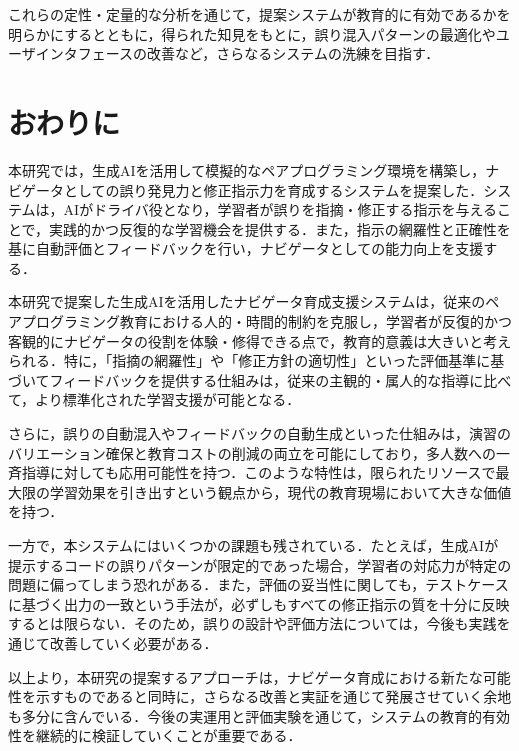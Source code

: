 \documentclass[twoside,twocolumn,10pt]{jsarticle}
\begin{document}
これらの定性・定量的な分析を通じて，提案システムが教育的に有効であるかを明らかにするとともに，得られた知見をもとに，誤り混入パターンの最適化やユーザインタフェースの改善など，さらなるシステムの洗練を目指す．


\section{おわりに}\label{sec:おわりに}

本研究では，生成AIを活用して模擬的なペアプログラミング環境を構築し，ナビゲータとしての誤り発見力と修正指示力を育成するシステムを提案した．システムは，AIがドライバ役となり，学習者が誤りを指摘・修正する指示を与えることで，実践的かつ反復的な学習機会を提供する．また，指示の網羅性と正確性を基に自動評価とフィードバックを行い，ナビゲータとしての能力向上を支援する．

本研究で提案した生成AIを活用したナビゲータ育成支援システムは，従来のペアプログラミング教育における人的・時間的制約を克服し，学習者が反復的かつ客観的にナビゲータの役割を体験・修得できる点で，教育的意義は大きいと考えられる．特に，「指摘の網羅性」や「修正方針の適切性」といった評価基準に基づいてフィードバックを提供する仕組みは，従来の主観的・属人的な指導に比べて，より標準化された学習支援が可能となる．

さらに，誤りの自動混入やフィードバックの自動生成といった仕組みは，演習のバリエーション確保と教育コストの削減の両立を可能にしており，多人数への一斉指導に対しても応用可能性を持つ．このような特性は，限られたリソースで最大限の学習効果を引き出すという観点から，現代の教育現場において大きな価値を持つ．

一方で，本システムにはいくつかの課題も残されている．たとえば，生成AIが提示するコードの誤りパターンが限定的であった場合，学習者の対応力が特定の問題に偏ってしまう恐れがある．また，評価の妥当性に関しても，テストケースに基づく出力の一致という手法が，必ずしもすべての修正指示の質を十分に反映するとは限らない．そのため，誤りの設計や評価方法については，今後も実践を通じて改善していく必要がある．

以上より，本研究の提案するアプローチは，ナビゲータ育成における新たな可能性を示すものであると同時に，さらなる改善と実証を通じて発展させていく余地も多分に含んでいる．今後の実運用と評価実験を通じて，システムの教育的有効性を継続的に検証していくことが重要である．

\end{document}

